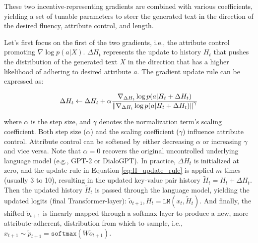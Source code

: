 These two incentive-representing gradients are combined with various coefficients, yielding a set of tunable parameters to steer the generated text in the direction of the desired fluency, attribute control, and length.

Let's first focus on the first of the two gradients, i.e., the attribute control promoting $\nabla \log p(a | X)$. $\Delta H_t$ represents the update to history $H_t$ that pushes the distribution of the generated text $X$ in the direction that has a higher likelihood of adhering to desired attribute $a$. The gradient update rule can be expressed as:

\begin{equation}
    \Delta H_t \leftarrow \Delta H_t + \alpha
    \frac{\nabla_{\Delta H_t} \log p(a | H_t + \Delta H_t)}
    {\norm{\nabla_{\Delta H_t} \log p(a | H_t + \Delta H_t)}^{\gamma}}
\label{eq:H_update_rule}
\end{equation}

where $\alpha$ is the step size, and $\gamma$ denotes the normalization term's scaling coefficient. Both step size ($\alpha$) and the scaling coefficient ($\gamma$) influence attribute control. Attribute control can be softened by either decreasing $\alpha$ or increasing $\gamma$ and vice versa. Note that $\alpha = 0$ recovers the original uncontrolled underlying language model (e.g., GPT-2 or DialoGPT). In practice, $\Delta H_t$ is initialized at zero, and the update rule in Equation \ref{eq:H_update_rule} is applied $m$ times (usually 3 to 10), resulting in the updated key-value pair history $\tilde{H}_t  = H_t + \Delta H_t$. Then the updated history $\tilde{H}_t$ is passed through the language model, yielding the updated logits (final Transformer-layer): $\tilde{o}_{t + 1}, H_t = \texttt{LM}(x_t, \tilde{H}_t)$. And finally, the shifted $\tilde{o}_{t + 1}$ is linearly mapped through a softmax layer to produce a new, more attribute-adherent, distribution from which to sample, i.e., $x_{t + 1} \sim \tilde{p}_{t + 1} = \texttt{softmax} \left( W \tilde{o}_{t + 1} \right)$.

